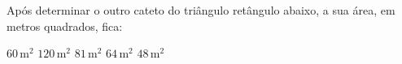 Após determinar o outro cateto do triângulo retângulo abaixo, a sua área, em metros quadrados, fica:

\parbox{0.4\linewidth}{

$60$\,m$^2$
$120$\,m$^2$
$81$\,m$^2$
$64$\,m$^2$
$48$\,m$^2$

}\parbox{0.59\linewidth}{
\begin{center}
\vspace{-6mm}
\vspace{-9mm}
\end{center}
}


